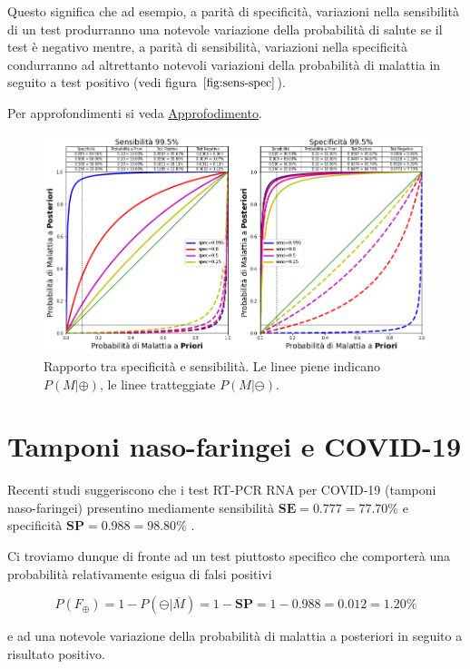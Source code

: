 \documentclass[11pt]{article}
\begin{document}
Questo significa che ad esempio, a parità di specificità, variazioni
nella sensibilità di un test produrranno una notevole variazione della
probabilità di salute se il test è negativo mentre, a parità di
sensibilità, variazioni nella specificità condurranno ad altrettanto
notevoli variazioni della probabilità di malattia in seguito a test
positivo (vedi figura \(\ref{fig:sens-spec}\)).

Per approfondimenti si veda
\href{https://maxpierini.it/ncov/approfondimento-test.pdf}{Approfodimento}.

    \begin{figure}
\centering
    \includegraphics{sens-spec}
    \caption{Rapporto tra specificità e sensibilità. Le linee piene indicano $P(M|\oplus)$, le linee tratteggiate $P(M|\ominus).$}
    \label{fig:sens-spec}
\end{figure}

    \hypertarget{tamponi-naso-faringei-e-covid-19}{%
\section{Tamponi naso-faringei e
COVID-19}\label{tamponi-naso-faringei-e-covid-19}}

    Recenti studi suggeriscono che i test RT-PCR RNA per COVID-19 (tamponi
naso-faringei) presentino mediamente sensibilità
\(\mathbf{SE} = 0.777 = 77.70\%\) e specificità
\(\mathbf{SP}=0.988=98.80\%\) \cite{padhye2020reconstructed}.

    
    Ci troviamo dunque di fronte ad un test piuttosto specifico che
comporterà una probabilità relativamente esigua di falsi positivi

    \[
P(F_{\oplus}) = 1 - P(\ominus|\overline{M}) = 1 - \mathbf{SP} = 1 - 0.988 = 0.012 = 1.20\%
\]

    
    e ad una notevole variazione della probabilità di malattia a posteriori
in seguito a risultato positivo.
\end{document}
